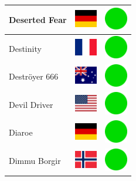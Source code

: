 \documentclass[12pt, a4paper, twoside]{report}
\begin{document}
\begin{center}
\begin{longtable}{|p{5cm}|p{2cm}|p{2cm}|}
Deserted Fear & \includegraphics[width=1cm]{4x3/de} & \includegraphics[width=1cm]{likes/y} \\ \hline
Destinity & \includegraphics[width=1cm]{4x3/fr} & \includegraphics[width=1cm]{likes/y} \\ \hline
Deströyer 666 & \includegraphics[width=1cm]{4x3/au} & \includegraphics[width=1cm]{likes/y} \\ \hline
Devil Driver & \includegraphics[width=1cm]{4x3/us} & \includegraphics[width=1cm]{likes/y} \\ \hline
Diaroe & \includegraphics[width=1cm]{4x3/de} & \includegraphics[width=1cm]{likes/y} \\ \hline
Dimmu Borgir & \includegraphics[width=1cm]{4x3/no} & \includegraphics[width=1cm]{likes/y} \\ \hline

\end{longtable}
\end{center}
\end{document}
